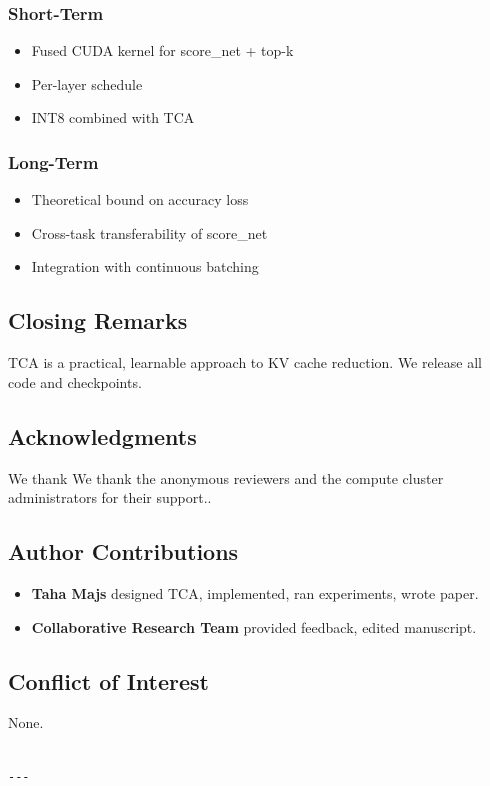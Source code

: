 \subsubsection{Short-Term}
\begin{itemize}
\item Fused CUDA kernel for score\_net + top-k
\item Per-layer   schedule
\item INT8 combined with TCA

\end{itemize}
\subsubsection{Long-Term}
\begin{itemize}
\item Theoretical bound on accuracy loss
\item Cross-task transferability of score\_net
\item Integration with continuous batching

\end{itemize}
\subsection{Closing Remarks}

TCA is a practical, learnable approach to KV cache reduction. We release all 
code and checkpoints.

\subsection{Acknowledgments}

We thank We thank the anonymous reviewers and the compute cluster administrators for their support..

\subsection{Author Contributions}

\begin{itemize}
\item \textbf{Taha Majs} designed TCA, implemented, ran experiments, wrote paper.
\item \textbf{Collaborative Research Team} provided feedback, edited manuscript.

\end{itemize}
\subsection{Conflict of Interest}

None.
\begin{lstlisting}

---
\end{lstlisting}